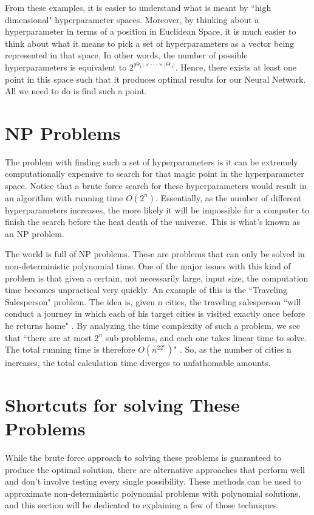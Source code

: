 \documentclass[12pt]{report}
\begin{document}
From these examples, it is easier to understand what is meant by ``high dimensional" hyperparameter spaces.
Moreover, by thinking about a hyperparameter in terms of a position in Euclidean Space, it is much easier to think about what it means to pick a set of hyperparameters as a vector being represented in that space.
In other words, the number of possible hyperparameters is equivalent to $2^{|\Theta_1| \times \cdot\cdot\cdot \times |\Theta_n|}$. Hence, there exists at least one point in this space such that it produces optimal results for our Neural Network. All we need to do is find such a point.

\section{NP Problems}
The problem with finding such a set of hyperparameters is it can be extremely computationally expensive to search for that magic point in the hyperparameter space. Notice that a brute force search for these hyperparameters would result in an algorithm with running time $O(2^n)$. Essentially, as the number of different hyperparameters increases, the more likely it will be impossible for a computer to finish the search before the heat death of the universe. This is what's known as an NP problem.

The world is full of NP problems. These are problems that can only be solved in non-deterministic polynomial time. One of the major issues with this kind of problem is that given a certain, not necessarily large, input size, the computation time becomes unpractical very quickly. An example of this is the ``Traveling Salesperson" problem. The idea is, given n cities, the traveling salesperson ``will conduct a journey in which each of his target cities is visited exactly once before he returns home" \cite{dasgupta2008algorithms}. By analyzing the time complexity of such a problem, we see that ``there are at most $2^n$ sub-problems, and each one takes linear time to solve. The total running time is therefore $O(n^22^n)$" \cite{dasgupta2008algorithms}. So, as the number of cities n increases, the total calculation time diverges to unfathomable amounts.

\section{Shortcuts for solving These Problems}
While the brute force approach to solving these problems is guaranteed to produce the optimal solution, there are alternative approaches that perform well and don't involve testing every single possibility. These methods can be used to approximate non-deterministic polynomial problems with polynomial solutions, and this section will be dedicated to explaining a few of those techniques.
\end{document}
